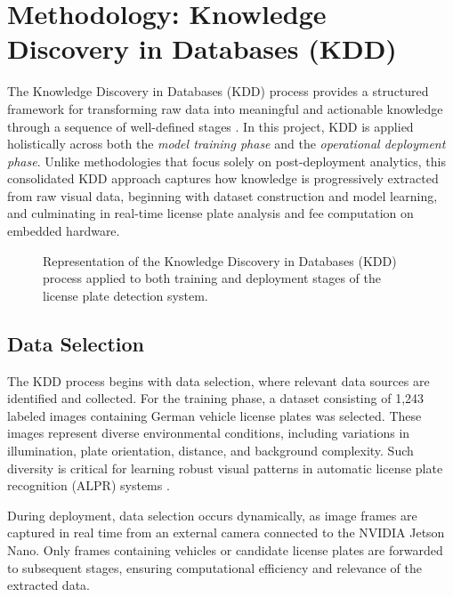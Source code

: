 \section{Methodology: Knowledge Discovery in Databases (KDD)}

\noindent
The Knowledge Discovery in Databases (KDD) process provides a structured framework for transforming raw data into meaningful and actionable knowledge through a sequence of well-defined stages \cite{fayyad1996knowledge}. In this project, KDD is applied holistically across both the \textit{model training phase} and the \textit{operational deployment phase}. Unlike methodologies that focus solely on post-deployment analytics, this consolidated KDD approach captures how knowledge is progressively extracted from raw visual data, beginning with dataset construction and model learning, and culminating in real-time license plate analysis and fee computation on embedded hardware.

\begin{figure}[htbp]
	\centering
	
	\caption{Representation of the Knowledge Discovery in Databases (KDD) process applied to both training and deployment stages of the license plate detection system.}
	\label{fig:kdd_vertical_refined}
\end{figure}
 


\subsection{Data Selection}

The KDD process begins with data selection, where relevant data sources are identified and collected. For the training phase, a dataset consisting of 1,243 labeled images containing German vehicle license plates was selected. These images represent diverse environmental conditions, including variations in illumination, plate orientation, distance, and background complexity. Such diversity is critical for learning robust visual patterns in automatic license plate recognition (ALPR) systems \cite{du2013automatic,silva2018license}.

During deployment, data selection occurs dynamically, as image frames are captured in real time from an external camera connected to the NVIDIA Jetson Nano. Only frames containing vehicles or candidate license plates are forwarded to subsequent stages, ensuring computational efficiency and relevance of the extracted data.

